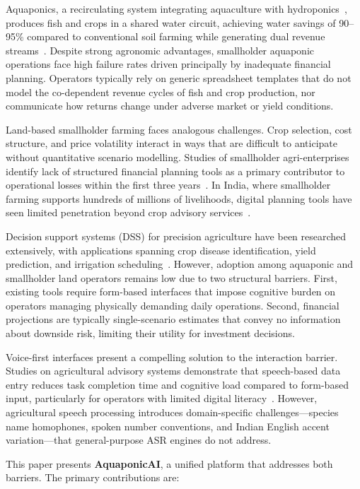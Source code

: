 \documentclass[conference]{IEEEtran}
\begin{document}
Aquaponics, a recirculating system integrating aquaculture with
hydroponics~\cite{ref1}, produces fish and crops in a shared water circuit,
achieving water savings of 90--95\% compared to conventional soil
farming while generating dual revenue streams~\cite{ref7}. Despite
strong agronomic advantages, smallholder aquaponic operations face high
failure rates driven principally by inadequate financial planning.
Operators typically rely on generic spreadsheet templates that do not
model the co-dependent revenue cycles of fish and crop production, nor
communicate how returns change under adverse market or yield conditions.

Land-based smallholder farming faces analogous challenges. Crop
selection, cost structure, and price volatility interact in ways that
are difficult to anticipate without quantitative scenario modelling.
Studies of smallholder agri-enterprises identify lack of structured
financial planning tools as a primary contributor to operational
losses within the first three years~\cite{ref4}.
In India, where smallholder farming supports hundreds of millions of
livelihoods, digital planning tools have seen limited penetration
beyond crop advisory services~\cite{ref18}.

Decision support systems (DSS) for precision agriculture have been
researched extensively, with applications spanning crop disease
identification, yield prediction, and irrigation
scheduling~\cite{ref2,ref15,ref16}. However, adoption among aquaponic and
smallholder land operators remains low due to two structural barriers.
First, existing tools require form-based interfaces that impose
cognitive burden on operators managing physically demanding daily
operations. Second, financial projections are typically single-scenario
estimates that convey no information about downside risk, limiting
their utility for investment decisions.

Voice-first interfaces present a compelling solution to the interaction
barrier. Studies on agricultural advisory systems demonstrate that
speech-based data entry reduces task completion time and cognitive
load compared to form-based input, particularly for operators with
limited digital literacy~\cite{ref3,ref20}. However, agricultural speech
processing introduces domain-specific challenges---species name
homophones, spoken number conventions, and Indian English accent
variation---that general-purpose ASR engines do not address.

This paper presents \textbf{AquaponicAI}, a unified platform that
addresses both barriers. The primary contributions are:
\end{document}
